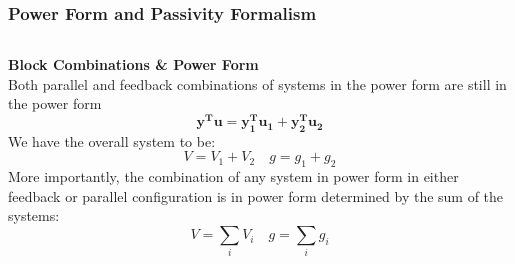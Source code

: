 \documentclass[11pt,handout]{beamer}   %
\begin{document}
\begin{frame}
\frametitle{Power Form and Passivity Formalism}
\footnotesize
\begin{columns}
\begin{column}{0.5\textwidth}
\textbf{Block Combinations \& Power Form}\\
Both parallel and feedback combinations of systems in the power form are still in the power form
\begin{equation*}
\mathbf{y^Tu = y_1^Tu_1+y_2^Tu_2}
\end{equation*}
We have the overall system to be:
\begin{equation*}
V = V_1 + V_2 \quad g = g_1 + g_2
\end{equation*}
More importantly, the combination of any system in power form in either feedback or parallel configuration is in power form determined by the sum of the systems:
\begin{equation*}
V = \sum_i V_i \quad g = \sum_i g_i
\end{equation*}


\end{column}
\end{columns}
\end{frame}
\end{document}
